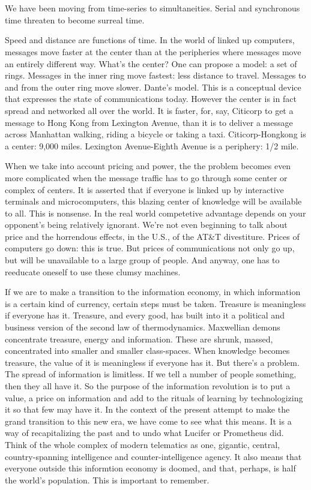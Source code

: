 \chapter{}%

We have been moving from time-series to
simultaneities. Serial and synchronous time
threaten to become surreal time.

Speed and distance are functions of time.
In the world of linked up computers, messages move faster at the center than at the
peripheries where messages move an entirely different way. What's the center? One
can propose a model: a set of rings. Messages
in the inner ring move fastest: less distance
to travel. Messages to and from the outer ring
move slower. Dante's model. This is a conceptual device that expresses the state of
communications today. However the center
is in fact spread and networked all over the
world. It is faster, for, say, Citicorp to get a
message to Hong Kong from Lexington Avenue, than it is to deliver a message across
Manhattan walking, riding a bicycle or taking a taxi. Citicorp-Hongkong is a center:
9,000 miles. Lexington Avenue-Eighth Avenue is a periphery: 1/2 mile.

When we take into account pricing and
power, the the problem becomes even more
complicated when the message traffic has to
go through some center or complex of centers. It is asserted that if everyone is linked
up by interactive terminals and microcomputers, this blazing center of knowledge will
be available to all. This is nonsense. In the
real world competetive advantage depends
on your opponent's being relatively ignorant. We're not even beginning to talk about
price and the horrendous effects, in the U.S.,
of the AT\&T divestiture. Prices of computers
go down: this is true. But prices of communications not only go up, but will be unavailable to a large group of people. And anyway,
one has to reeducate oneself to use these
clumsy machines.

If we are to make a transition to the information economy, in which information is a
certain kind of currency, certain steps must
be taken. Treasure is meaningless if everyone has it. Treasure, and every good, has
built into it a political and business version
of the second law of thermodynamics. Maxwellian demons concentrate treasure, energy
and information. These are shrunk, massed,
concentrated into smaller and smaller class-spaces. When knowledge becomes treasure,
the value of it is meaningless if everyone has
it. But there's a problem. The spread of
information is limitless. If we tell a number
of people something, then they all have it. So
the purpose of the information revolution is
to put a value, a price on information and
add to the rituals of learning by technologizing it so that few may have it. In the context
of the present attempt to make the grand
transition to this new era, we have come to
see what this means. It is a way of recapitalizing the past and to undo what Lucifer or
Prometheus did. Think of the whole complex of modern telematics as one, gigantic,
central, country-spanning intelligence and
counter-intelligence agency. It also means
that everyone outside this informtion economy is doomed, and that, perhaps, is half the
world's population. This is important to remember.

